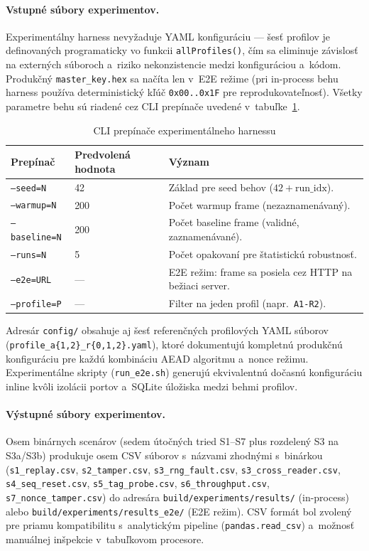 \documentclass[a4paper]{feidipsp}
\begin{document}
\paragraph{Vstupné súbory experimentov.}
Experimentálny harness nevyžaduje YAML konfiguráciu --- šesť profilov je definovaných programaticky vo funkcii \texttt{allProfiles()}, čím sa eliminuje závislosť na externých súboroch a~riziko nekonzistencie medzi konfiguráciou a~kódom. Produkčný \texttt{master\_key.hex} sa načíta len v~E2E režime (pri in-process behu harness používa deterministický kľúč \texttt{0x00..0x1F} pre reprodukovateľnosť). Všetky parametre behu sú riadené cez CLI prepínače uvedené v~tabuľke~\ref{t:exp-cli}.

\begin{table}[!htbp]
\centering
\footnotesize
\renewcommand{\arraystretch}{1.15}
\caption{CLI prepínače experimentálneho harnessu}\label{t:exp-cli}
\begin{tabular}{|l|l|p{5.2cm}|} \hline
\textbf{Prepínač} & \textbf{Predvolená hodnota} & \textbf{Význam} \\ \hline
\texttt{--seed=N}     & 42    & Základ pre seed behov ($42 + \text{run\_idx}$). \\ \hline
\texttt{--warmup=N}   & 200   & Počet warmup frame (nezaznamenávaný). \\ \hline
\texttt{--baseline=N} & 200   & Počet baseline frame (validné, zaznamenávané). \\ \hline
\texttt{--runs=N}     & 5     & Počet opakovaní pre štatistickú robustnosť. \\ \hline
\texttt{--e2e=URL}    & ---   & E2E režim: frame sa posiela cez HTTP na bežiaci server. \\ \hline
\texttt{--profile=P}  & ---   & Filter na jeden profil (napr.\ \texttt{A1-R2}). \\ \hline
\end{tabular}
\end{table}

\noindent Adresár \texttt{config/} obsahuje aj šesť referenčných profilových YAML súborov (\texttt{profile\_a\{1,2\}\_r\{0,1,2\}.yaml}), ktoré dokumentujú kompletnú produkčnú konfiguráciu pre každú kombináciu AEAD algoritmu a~nonce režimu. Experimentálne skripty (\texttt{run\_e2e.sh}) generujú ekvivalentnú dočasnú konfiguráciu inline kvôli izolácii portov a~SQLite úložiska medzi behmi profilov.

\paragraph{Výstupné súbory experimentov.}
Osem binárnych scenárov (sedem útočných tried S1--S7 plus rozdelený S3 na S3a/S3b) produkuje osem CSV súborov s~názvami zhodnými s~binárkou (\texttt{s1\_replay.csv}, \texttt{s2\_tamper.csv}, \texttt{s3\_rng\_fault.csv}, \texttt{s3\_cross\_reader.csv}, \texttt{s4\_seq\_reset.csv}, \texttt{s5\_tag\_probe.csv}, \texttt{s6\_throughput.csv}, \texttt{s7\_nonce\_tamper.csv}) do adresára \texttt{build/experiments/results/} (in-process) alebo \texttt{build/experiments/results\_e2e/} (E2E režim). CSV formát bol zvolený pre priamu kompatibilitu s~analytickým pipeline (\texttt{pandas.read\_csv}) a~možnosť manuálnej inšpekcie v~tabuľkovom procesore.
\end{document}
